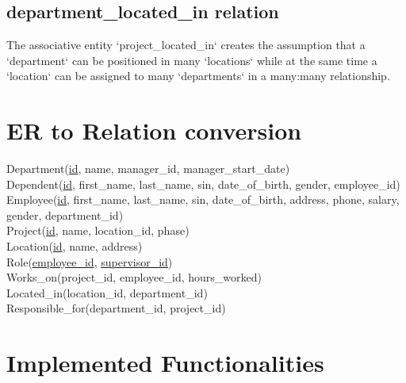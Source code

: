 \documentclass[11pt,letterpaper]{article}
\begin{document}
\subsection{department\_located\_in relation}
The associative entity `project\_located\_in` creates the assumption that a `department` can be positioned in many `locations` while at the same time a `location` can be assigned to many `departments` in a many:many relationship.

\pagebreak

\section{ER to Relation conversion }

Department(\uline{id}, name, manager\_id, manager\_start\_date)\\
Dependent(\uline{id}, first\_name, last\_name, sin, date\_of\_birth, gender, employee\_id)\\
Employee(\uline{id}, first\_name, last\_name, sin, date\_of\_birth, address, phone, salary, gender, department\_id)\\
Project(\uline{id}, name, location\_id, phase)\\
Location(\uline{id}, name, address)\\
Role(\uline{employee\_id}, \uline{supervisor\_id})\\
Works\_on(project\_id, employee\_id, hours\_worked)\\
Located\_in(location\_id, department\_id)\\
Responsible\_for(department\_id, project\_id)\\

\pagebreak

\section{Implemented Functionalities}
\end{document}

